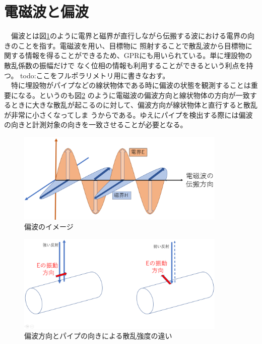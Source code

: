 \documentclass[12pt,a4paper]{jsreport}
\begin{document}
\section{電磁波と偏波}
　偏波とは図\ref{偏波のイメージ}のように電界と磁界が直行しながら伝搬する波における電界の向きのことを指す。電磁波を用い、目標物に
照射することで散乱波から目標物に関する情報を得ることができるため、GPRにも用いられている。単に埋設物の散乱係数の振幅だけで
なく位相の情報も利用することができるという利点を持つ。
todo:ここをフルポラリメトリ用に書きなおす。
\\　特に埋設物がパイプなどの線状物体である時に偏波の状態を観測することは重要になる。というのも図\ref{偏波方向とパイプの向きによる反射強度の違い}
のように電磁波の偏波方向と線状物体の方向が一致するときに大きな散乱が起こるのに対して、偏波方向が線状物体と直行すると散乱が非常に小さくなってしま
うからである。ゆえにパイプを検出する際には偏波の向きと計測対象の向きを一致させることが必要となる。
\begin{figure}[h]
  \begin{center}
   \includegraphics[width=10cm]{./image/wave_propagation.png}
  \caption{偏波のイメージ}\label{偏波のイメージ}
  \end{center}
  \end{figure}

  \begin{figure}[h]
    \begin{center}
     \includegraphics[width=10cm]{./image/final.png}
    \caption{偏波方向とパイプの向きによる散乱強度の違い}\label{偏波方向とパイプの向きによる反射強度の違い}
    \end{center}
    \end{figure}
\end{document}
